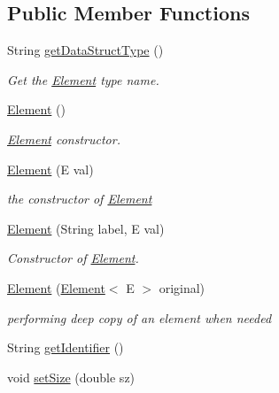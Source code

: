 \subsection*{Public Member Functions}
\begin{DoxyCompactItemize}
\item 
String \mbox{\hyperlink{classbridges_1_1base_1_1_element_a6a1b70fa4b1936d10c6deb433acf8cd9}{get\+Data\+Struct\+Type}} ()
\begin{DoxyCompactList}\small\item\em Get the \mbox{\hyperlink{classbridges_1_1base_1_1_element}{Element}} type name. \end{DoxyCompactList}\item 
\mbox{\hyperlink{classbridges_1_1base_1_1_element_aa5fc5728f2ed4b041118a77409442390}{Element}} ()
\begin{DoxyCompactList}\small\item\em \mbox{\hyperlink{classbridges_1_1base_1_1_element}{Element}} constructor. \end{DoxyCompactList}\item 
\mbox{\hyperlink{classbridges_1_1base_1_1_element_a6cb9b3b85b923602aad5c1be6696d825}{Element}} (E val)
\begin{DoxyCompactList}\small\item\em the constructor of \mbox{\hyperlink{classbridges_1_1base_1_1_element}{Element}} \end{DoxyCompactList}\item 
\mbox{\hyperlink{classbridges_1_1base_1_1_element_a14e857e8050eac518900a458f0364d8e}{Element}} (String label, E val)
\begin{DoxyCompactList}\small\item\em Constructor of \mbox{\hyperlink{classbridges_1_1base_1_1_element}{Element}}. \end{DoxyCompactList}\item 
\mbox{\hyperlink{classbridges_1_1base_1_1_element_a91db9de70b65a1d7b5f27c1c0b909832}{Element}} (\mbox{\hyperlink{classbridges_1_1base_1_1_element}{Element}}$<$ E $>$ original)
\begin{DoxyCompactList}\small\item\em performing deep copy of an element when needed \end{DoxyCompactList}\item 
String \mbox{\hyperlink{classbridges_1_1base_1_1_element_ad5496f568b4cca3909800eceea5fb47d}{get\+Identifier}} ()
\item 
void \mbox{\hyperlink{classbridges_1_1base_1_1_element_a57153c203d8d2790650edb14ad61c338}{set\+Size}} (double sz)

\end{DoxyCompactItemize}

